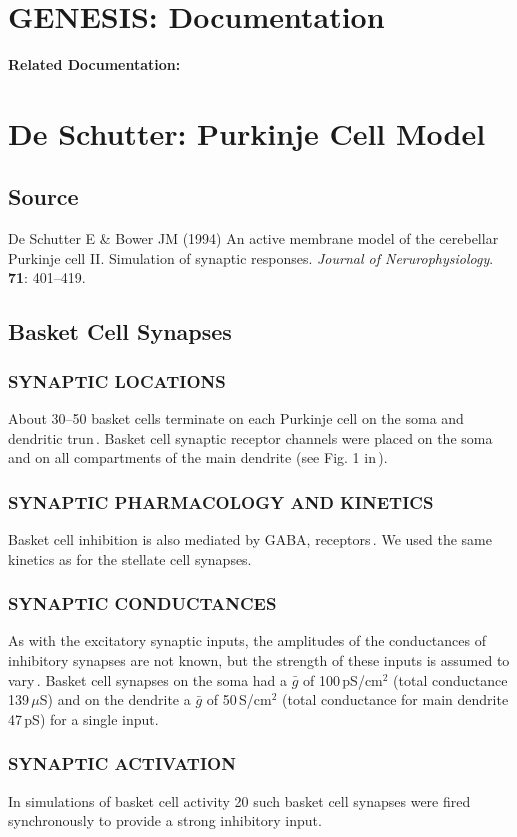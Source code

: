 \documentclass[12pt]{article}
\begin{document}
\section*{GENESIS: Documentation}

{\bf Related Documentation:}

\section*{De Schutter: Purkinje Cell Model}

\subsection*{Source}

De Schutter E \& Bower JM (1994) An active membrane model of the cerebellar Purkinje cell II. Simulation of synaptic responses. {\it Journal of Nerurophysiology}. {\bf 71}: 401--419.

\subsection*{Basket Cell Synapses}

\subsubsection*{SYNAPTIC LOCATIONS}
About 30--50 basket cells terminate on each Purkinje cell on 
the soma and dendritic trun\,\cite{Palay:1974fk, Palkovits:1971vn}. 
Basket cell synaptic receptor
channels were placed on the soma and on all compartments
of the main dendrite (see Fig. 1 in\,\cite{De-Schutter-E:1994vn}).

\subsubsection*{SYNAPTIC PHARMACOLOGY AND KINETICS} 
Basket cell inhibition
is also mediated by GABA, receptors\,\cite{Gabbot:1986fk, Ito:1984uq}. 
We used the same kinetics as for the stellate cell synapses.

\subsubsection*{SYNAPTIC CONDUCTANCES}
As with the excitatory synaptic inputs,
the amplitudes of the conductances of inhibitory synapses
are not known, but the strength of these inputs is assumed to 
vary\,\cite{Bishop:1992ys}. Basket cell synapses on the soma had a $\bar g$ of
100\,pS/cm$^2$ (total conductance 139\,$\mu$S) and on the dendrite a $\bar g$ of
50\,S/cm$^2$ (total conductance for main dendrite 47\,pS) for a
single input.

\subsubsection*{SYNAPTIC ACTIVATION}
In simulations of basket cell activity 20
such basket cell synapses were fired synchronously to provide a
strong inhibitory input.



\end{document}
